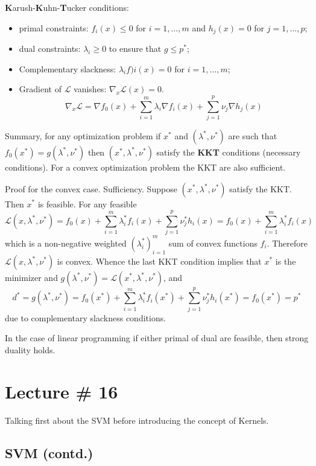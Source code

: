 \documentclass[a4paper]{article}
\newcommand{\Lcal}{\mathcal{L}}
\begin{document}
\textbf{K}arush-\textbf{K}uhn-\textbf{T}ucker conditions:
\begin{itemize}
	\item primal constraints: $f_i(x)\leq 0$ for $i=1,\ldots,m$ and $h_j(x) = 0$ for $j=1,\ldots,p$;
	\item dual constraints: $\lambda_i \geq 0$ to ensure that $g\leq p^*$;
	\item Complementary slackness: $\lambda_i f)i(x) = 0$ for $i=1,\ldots,m$;
	\item Gradient of $\Lcal$ vanishes: $\nabla_x \Lcal(x) = 0$.
	\[\nabla_x \Lcal = \nabla f_0(x) + \sum_{i=1}^m \lambda_i \nabla f_i(x) + \sum_{j=1}^p \nu_j \nabla h_j(x)\]
\end{itemize}
Summary, for any optimization problem if $x^*$ and $(\lambda^*,\nu^*)$ are such that
$f_0(x^*) = g(\lambda^*,\nu^*)$ then $(x^*,\lambda^*,\nu^*)$ satisfy the \textbf{KKT}
conditions (necessary conditions). For a convex optimization problem the KKT are also
sufficient.

Proof for the convex case. Sufficiency.
Suppose $(x^*,\lambda^*,\nu^*)$ satisfy the KKT. Then $x^*$ is feasible.
For any feasible
\[
\Lcal(x,\lambda^*,\nu^*)
= f_0(x) + \sum_{i=1}^m\lambda_i^* f_i(x) + \sum_{j=1}^p\nu_j^* h_i(x)
= f_0(x) + \sum_{i=1}^m\lambda_i^* f_i(x)
\]
which is a non-negative weighted $(\lambda_i^*)_{i=1}^m$ sum of convex functions
$f_i$. Therefore $\Lcal(x,\lambda^*,\nu^*)$ is convex. Whence the last KKT condition implies
that $x^*$ is the minimizer and $g(\lambda^*,\nu^*) = \Lcal(x^*,\lambda^*,\nu^*)$, and
\[
d^*
= g(\lambda^*,\nu^*)
= f_0(x^*) + \sum_{i=1}^m\lambda_i^* f_i(x^*) + \sum_{j=1}^p\nu_j^* h_i(x^*)
= f_0(x^*)
= p^*
\]
due to complementary slackness conditions.

In the case of linear programming if either primal of dual are feasible, then strong duality
holds.




\section{Lecture \# 16} %
\label{sec:lecture_16}

Talking first about the SVM before introducing the concept of Kernels.

\subsection{SVM (contd.)} %
\label{sub:svm_contd}
\end{document}
